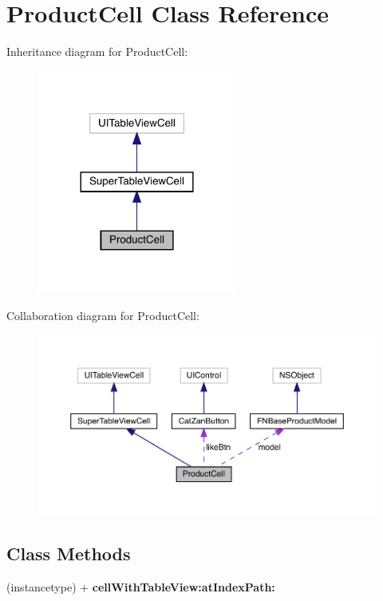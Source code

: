 \hypertarget{interface_product_cell}{}\section{Product\+Cell Class Reference}
\label{interface_product_cell}


Inheritance diagram for Product\+Cell\+:\nopagebreak
\begin{figure}[H]
\begin{center}
\leavevmode
\includegraphics[width=185pt]{interface_product_cell__inherit__graph}
\end{center}
\end{figure}


Collaboration diagram for Product\+Cell\+:\nopagebreak
\begin{figure}[H]
\begin{center}
\leavevmode
\includegraphics[width=350pt]{interface_product_cell__coll__graph}
\end{center}
\end{figure}
\subsection*{Class Methods}
\begin{DoxyCompactItemize}
\item 
\mbox{\label{interface_product_cell_a41d85b461373f2b4663be86da81bc094}} 
(instancetype) + {\bfseries cell\+With\+Table\+View\+:at\+Index\+Path\+:}
\end{DoxyCompactItemize}

